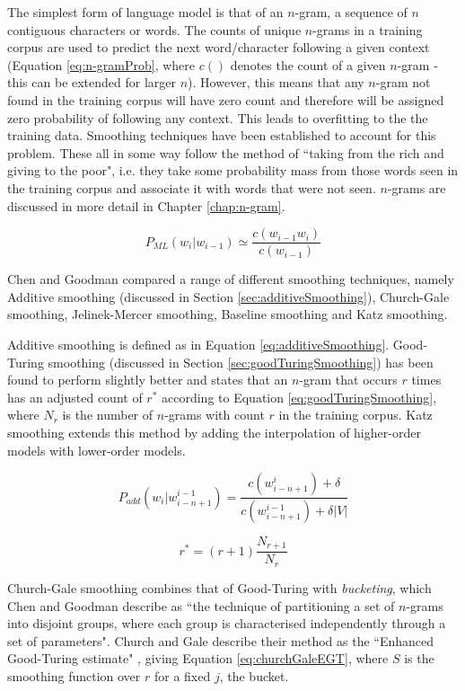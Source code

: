 The simplest form of language model is that of an $n$-gram, a sequence of $n$ contiguous characters or words. The counts of unique $n$-grams in a training corpus are used to predict the next word/character following a given context (Equation \ref{eq:n-gramProb}, where $c()$ denotes the count of a given $n$-gram - this can be extended for larger $n$). However, this means that any $n$-gram not found in the training corpus will have zero count and therefore will be assigned zero probability of following any context. This leads to overfitting to the the training data. Smoothing techniques have been established to account for this problem. These all in some way follow the method of ``taking from the rich and giving to the poor", i.e. they take some probability mass from those words seen in the training corpus and associate it with words that were not seen. $n$-grams are discussed in more detail in Chapter \ref{chap:n-gram}. 

\begin{equation}
P_{ML}(w_{i}|w_{i-1})\simeq\frac{c(w_{i-1}w_{i})}{c(w_{i-1})}
\label{eq:n-gramProb}
\end{equation}


Chen and Goodman \cite{chen1996empirical} \cite{chen1999empirical} compared a range of different smoothing techniques, namely Additive smoothing (discussed in Section \ref{sec:additiveSmoothing}), Church-Gale smoothing, Jelinek-Mercer smoothing, Baseline smoothing and Katz smoothing.  

Additive smoothing is defined as in Equation \ref{eq:additiveSmoothing}. Good-Turing smoothing (discussed in Section \ref{sec:goodTuringSmoothing}) has been found to perform slightly better and states that an $n$-gram that occurs $r$ times has an adjusted count of $r^{*}$ according to Equation \ref{eq:goodTuringSmoothing}, where $N_{r}$ is the number of $n$-grams with count $r$ in the training corpus. Katz smoothing extends this method by adding the interpolation of higher-order models with lower-order models. 

\begin{equation}
\label{eq:additiveSmoothing}
P_{add}(w_{i}|w_{i-n+1}^{i-1})=\frac{c(w_{i-n+1}^{i})+\delta}{c(w_{i-n+1}^{i-1})+\delta|V|}
\end{equation}

\begin{equation}
\label{eq:goodTuringSmoothing}
r^{*}=(r+1)\frac{N_{r+1}}{N_{r}}
\end{equation}

Church-Gale smoothing combines that of Good-Turing with \textit{bucketing}, which Chen and Goodman describe as ``the technique of partitioning a set of $n$-grams into disjoint groups, where each group is characterised independently through a set of parameters". Church and Gale describe their method as the ``Enhanced Good-Turing estimate" \cite{church1991comparison}, giving Equation \ref{eq:churchGaleEGT}, where $S$ is the smoothing function over $r$ for a fixed $j$, the bucket.

